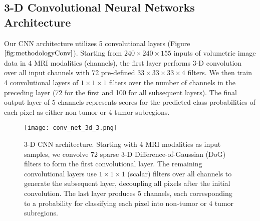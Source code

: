 \documentclass{llncs}
\begin{document}
\subsection{3-D Convolutional Neural Networks Architecture}
Our CNN architecture utilizes 5 convolutional layers (Figure $\ref{fig:methodologyConv}$).  Starting from $240 \times 240 \times 155$ inputs of volumetric image data in 4 MRI modalities (channels), the first layer performs 3-D convolution over all input channels with 72 pre-defined $33 \times 33 \times 33 \times 4$ filters. We then train 4 convolutional layers of $1 \times 1 \times 1$ filters over the number of channels in the preceding layer (72 for the first and 100 for all subsequent layers). The final output layer of 5 channels represents scores for the predicted class probabilities of each pixel as either non-tumor or 4 tumor subregions.
\begin{figure}[htb]
	\centering
	\texttt{[image: conv\_net\_3d\_3.png]}
	\caption{{3-D CNN architecture.} \small{Starting with 4 MRI modalities as input samples, we convolve 72 sparse 3-D Difference-of-Gaussian (DoG) filters to form the first convolutional layer.  The remaining convolutional layers use $1 \times 1 \times 1$ (scalar) filters over all channels to generate the subsequent layer, decoupling all pixels after the initial convolution.  The last layer produces 5 channels, each corresponding to a probability for classifying each pixel into non-tumor or 4 tumor subregions. }}
	\label{fig:methodologyConv}
\end{figure}
\end{document}
